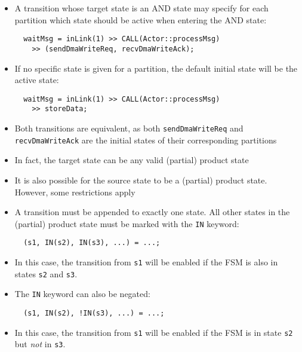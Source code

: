 \begin{frame}[fragile=singleslide]
\begin{itemize}
\item A transition whose target state is an AND state may specify for each partition which state should be active when entering the AND state:
\begin{lstlisting}
  waitMsg = inLink(1) >> CALL(Actor::processMsg)
    >> (sendDmaWriteReq, recvDmaWriteAck);
\end{lstlisting}
\item If no specific state is given for a partition, the default initial state will be the active state:
\begin{lstlisting}
  waitMsg = inLink(1) >> CALL(Actor::processMsg)
    >> storeData;
\end{lstlisting}
\item Both transitions are equivalent, as both \texttt{sendDmaWriteReq} and \texttt{recvDmaWriteAck} are the initial states
      of their corresponding partitions
\item In fact, the target state can be any valid (partial) product state
\end{itemize}
\end{frame}

\begin{frame}[fragile=singleslide]
\begin{itemize}
\item It is also possible for the source state to be a (partial) product state. However, some restrictions apply
\item A transition must be appended to exactly one state. All other states in the (partial) product state
      must be marked with the \texttt{IN} keyword:
\begin{lstlisting}
  (s1, IN(s2), IN(s3), ...) = ...;
\end{lstlisting}
\item In this case, the transition from \texttt{s1}  will be enabled if the FSM is also in states \texttt{s2} and \texttt{s3}.
\item The \texttt{IN} keyword can also be negated:
\begin{lstlisting}
  (s1, IN(s2), !IN(s3), ...) = ...;
\end{lstlisting}
\item In this case, the transition from \texttt{s1}  will be enabled if the FSM is in state \texttt{s2} but \emph{not} in \texttt{s3}.
\end{itemize}
\end{frame}

